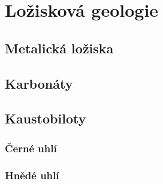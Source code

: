 \chapter{Ložisková geologie}

\section{Metalická ložiska}

\section{Karbonáty}

\section{Kaustobiloty}

\subsection{Černé uhlí}
\subsection{Hnědé uhlí}